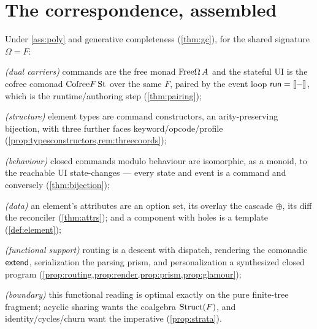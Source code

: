 \documentclass[../uxoxo-main]{subfiles}
\begin{document}

\section{The correspondence, assembled}\label{sec:synth}
\begin{theorem}\label{thm:correspondence}
Under \cref{ass:poly} and generative completeness (\cref{thm:gc}), for the shared
signature $\Omega=F$:
\begin{definitionlist}
  \item \emph{(dual carriers)} commands are the free monad $\mathrm{Free}\Omega\,A$ and the
        stateful UI is the cofree comonad $\mathrm{Cofree} F\,\mathrm{St}$ over the same $F$, paired
        by the event loop $\mathsf{run}=\llbracket - \rrbracket$, which is the runtime/authoring step
        (\cref{thm:pairing});
  \item \emph{(structure)} element types are command constructors, an
        arity-preserving bijection, with three further faces keyword/opcode/profile
        (\cref{prop:typesconstructors,rem:threecoords});
  \item \emph{(behaviour)} closed commands modulo behaviour are isomorphic, as a
        monoid, to the reachable UI state-changes --- every state and event is a
        command and conversely (\cref{thm:bijection});
  \item \emph{(data)} an element's attributes are an option set, its overlay the
        cascade $\oplus$, its diff the reconciler (\cref{thm:attrs}); and a
        component with holes is a template (\cref{def:element});
  \item \emph{(functional support)} routing is a  descent with
         dispatch, rendering the comonadic $\mathsf{extend}$, serialization
        the parsing prism, and personalization a synthesized closed program
        (\cref{prop:routing,prop:render,prop:prism,prop:glamour});
  \item \emph{(boundary)} this functional reading is optimal exactly on the pure
        finite-tree fragment; acyclic sharing wants the coalgebra $\mathrm{Struct}(F)$, and
        identity/cycles/churn want the imperative (\cref{prop:strata}).
\end{definitionlist}
\end{theorem}
\end{document}
